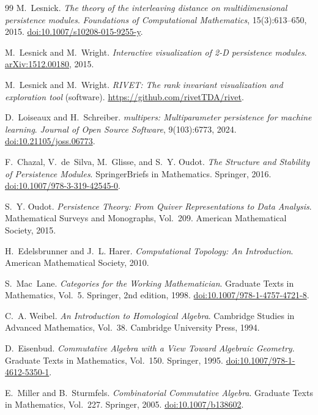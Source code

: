 \documentclass[11pt]{article}
\theoremstyle{definition}
\theoremstyle{remark}
\begin{document}
\begin{thebibliography}{99}
M.~Lesnick.
\newblock \emph{The theory of the interleaving distance on multidimensional persistence modules}.
\newblock \emph{Foundations of Computational Mathematics}, 15(3):613--650, 2015.
\newblock \href{https://doi.org/10.1007/s10208-015-9255-y}{doi:10.1007/s10208-015-9255-y}.

M.~Lesnick and M.~Wright.
\newblock \emph{Interactive visualization of 2-D persistence modules}.
\newblock \href{https://arxiv.org/abs/1512.00180}{arXiv:1512.00180}, 2015.

M.~Lesnick and M.~Wright.
\newblock \emph{RIVET: The rank invariant visualization and exploration tool} (software).
\newblock \url{https://github.com/rivetTDA/rivet}.

D.~Loiseaux and H.~Schreiber.
\newblock \emph{multipers: Multiparameter persistence for machine learning}.
\newblock \emph{Journal of Open Source Software}, 9(103):6773, 2024.
\newblock \href{https://doi.org/10.21105/joss.06773}{doi:10.21105/joss.06773}.

F.~Chazal, V.~de~Silva, M.~Glisse, and S.~Y. Oudot.
\newblock \emph{The Structure and Stability of Persistence Modules}.
\newblock SpringerBriefs in Mathematics. Springer, 2016.
\newblock \href{https://doi.org/10.1007/978-3-319-42545-0}{doi:10.1007/978-3-319-42545-0}.

S.~Y. Oudot.
\newblock \emph{Persistence Theory: From Quiver Representations to Data Analysis}.
\newblock Mathematical Surveys and Monographs, Vol.~209. American Mathematical Society, 2015.

H.~Edelsbrunner and J.~L. Harer.
\newblock \emph{Computational Topology: An Introduction}.
\newblock American Mathematical Society, 2010.

S.~Mac~Lane.
\newblock \emph{Categories for the Working Mathematician}.
\newblock Graduate Texts in Mathematics, Vol.~5. Springer, 2nd edition, 1998.
\newblock \href{https://doi.org/10.1007/978-1-4757-4721-8}{doi:10.1007/978-1-4757-4721-8}.

C.~A. Weibel.
\newblock \emph{An Introduction to Homological Algebra}.
\newblock Cambridge Studies in Advanced Mathematics, Vol.~38. Cambridge University Press, 1994.

D.~Eisenbud.
\newblock \emph{Commutative Algebra with a View Toward Algebraic Geometry}.
\newblock Graduate Texts in Mathematics, Vol.~150. Springer, 1995.
\newblock \href{https://doi.org/10.1007/978-1-4612-5350-1}{doi:10.1007/978-1-4612-5350-1}.

E.~Miller and B.~Sturmfels.
\newblock \emph{Combinatorial Commutative Algebra}.
\newblock Graduate Texts in Mathematics, Vol.~227. Springer, 2005.
\newblock \href{https://doi.org/10.1007/b138602}{doi:10.1007/b138602}.

\end{thebibliography}
\end{document}
